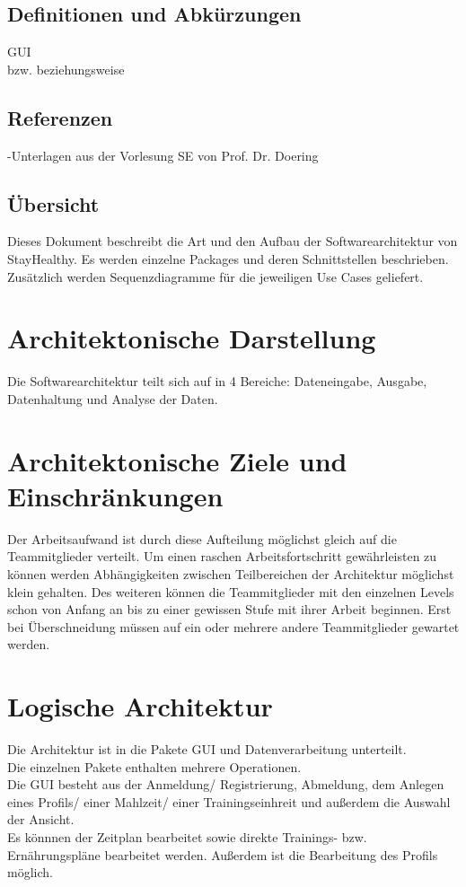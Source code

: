 \documentclass[12pt,a4paper,onecolumn]{article}
\begin{document}
\subsection{Definitionen und Abkürzungen}
GUI \\
bzw. beziehungsweise

\subsection{Referenzen}
 -Unterlagen aus der Vorlesung SE von Prof. Dr. Doering\\
\subsection{Übersicht}
Dieses Dokument beschreibt die Art und den Aufbau der Softwarearchitektur von StayHealthy.
Es werden einzelne Packages und deren Schnittstellen beschrieben. Zusätzlich werden Sequenzdiagramme für die jeweiligen Use Cases geliefert. 

\section{Architektonische Darstellung}
Die Softwarearchitektur teilt sich auf in 4 Bereiche: Dateneingabe, Ausgabe, Datenhaltung und Analyse der Daten.

\section{Architektonische Ziele und Einschränkungen}
Der Arbeitsaufwand ist durch diese Aufteilung möglichst gleich auf die Teammitglieder verteilt.
Um einen raschen Arbeitsfortschritt gewährleisten zu können werden Abhängigkeiten zwischen Teilbereichen der Architektur möglichst klein gehalten. Des weiteren können die Teammitglieder mit den einzelnen Levels schon von Anfang an bis zu einer gewissen Stufe mit ihrer Arbeit beginnen. Erst bei Überschneidung müssen auf ein oder mehrere andere Teammitglieder gewartet werden. 

\section{Logische Architektur}
Die Architektur ist in die Pakete GUI und Datenverarbeitung unterteilt.\\ Die einzelnen Pakete enthalten mehrere Operationen. \\
Die GUI besteht aus der Anmeldung/ Registrierung, Abmeldung, dem Anlegen eines Profils/ einer Mahlzeit/ einer Trainingseinhreit und außerdem die Auswahl der Ansicht. 
\\
Es könnnen der Zeitplan bearbeitet sowie direkte Trainings- bzw. Ernährungspläne bearbeitet werden. 
Außerdem ist die Bearbeitung des Profils möglich. 
\end{document}
